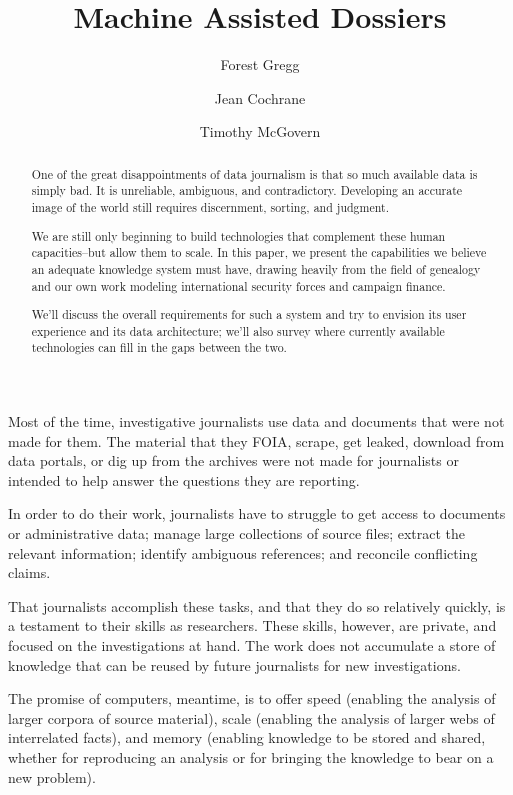 \documentclass[format=siggraph, review=true]{acmart}
\title{Machine Assisted Dossiers}
\author{Forest Gregg}
\affiliation{DataMade}
\author{Jean Cochrane}
\affiliation{DataMade}
\author{Timothy McGovern}
\begin{document}
\begin{abstract}One of the great disappointments of data journalism is that so much
  available data is simply bad. It is unreliable, ambiguous, and
  contradictory. Developing an accurate image of the world still
  requires discernment, sorting, and judgment.

  We are still only beginning to build technologies that
  complement these human capacities--but allow them to
  scale. In this paper, we present the capabilities we believe an
  adequate knowledge system must have, drawing heavily from the field
  of genealogy and our own work modeling international security forces
  and campaign finance.

  We'll discuss the overall requirements for such a system and try to envision its user experience and its data architecture; we'll also survey where currently available technologies can fill in the gaps between the two.
\end{abstract}

\maketitle

Most of the time, investigative journalists use data and documents
that were not made for them. The material that they FOIA, scrape, get
leaked, download from data portals, or dig up from the archives
were not made for journalists or intended to help answer the
questions they are reporting.

In order to do their work, journalists have to struggle to get access
to documents or administrative data; manage large collections of
source files; extract the relevant information; identify ambiguous
references; and reconcile conflicting claims.

That journalists accomplish these tasks, and that they do so relatively quickly,
is a testament to their skills as researchers. These skills, however, are
private, and focused on the investigations at hand. The work does not
accumulate a store of knowledge that can be reused by future
journalists for new investigations.

The promise of computers, meantime, is to offer speed (enabling the
analysis of larger corpora of source material), scale (enabling the
analysis of larger webs of interrelated facts), and memory (enabling
knowledge to be stored and shared, whether for reproducing an analysis
or for bringing the knowledge to bear on a new problem).
\end{document}
